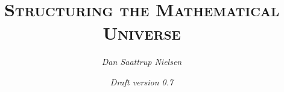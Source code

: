 \title{\textsc{Structuring the Mathematical Universe}}
\author{\textsl{Dan Saattrup Nielsen}}
\date{{\normalsize\textsl{Draft version 0.7}}}



\maketitle

\noindent
\pagestyle{fancy}
\fancyhead[RO,LE]{\thepage}
\fancyhead[LO]{\nouppercase\leftmark}
\fancyfoot{}
\setlength\headsep{20pt}